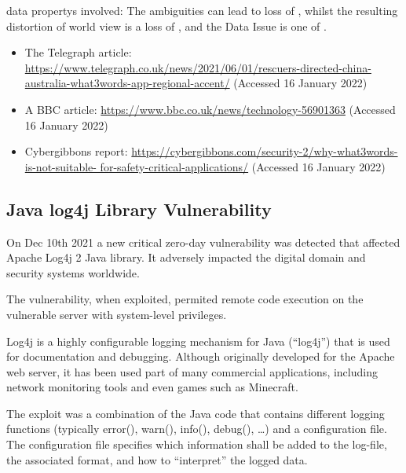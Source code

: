 \Glspl{data property} involved: The ambiguities can lead to loss of ,
whilst the resulting distortion of world view is a loss of ,
and the Data Issue is one of .

\begin{itemize}
\item The Telegraph article:
  \href{https://www.telegraph.co.uk/news/2021/06/01/rescuers-directed-china-australia-what3words-app-regional-accent/}
       {https://www.telegraph.co.uk/news/2021/06/01/rescuers-directed-china- australia-what3words-app-regional-accent/}
       (Accessed 16 January 2022)
     \item A BBC article: 
       \href{https://www.bbc.co.uk/news/technology-56901363}
            {https://www.bbc.co.uk/news/technology-56901363}
       (Accessed 16 January 2022)
          \item Cybergibbons report:
            \href{https://cybergibbons.com/security-2/why-what3words-is-not-suitable-for-safety-critical-applications/}
                 {https://cybergibbons.com/security-2/why-what3words-is-not-suitable- for-safety-critical-applications/}
       (Accessed 16 January 2022)
\end{itemize}

\cbstart\subsection{Java log4j Library Vulnerability}\cbend\label{bkm:incacc:log4j}
On Dec 10th 2021 a new critical zero-day vulnerability was detected that affected Apache Log4j 2 Java library. 
It adversely impacted the digital domain and security systems worldwide.

The vulnerability, when exploited, permited remote code execution on the vulnerable server with system-level privileges.

Log4j is a highly configurable logging mechanism for Java (“log4j”) that is used for documentation and debugging.
Although originally developed for the Apache web server, it has been used part of many commercial applications,
including network monitoring tools and even games such as Minecraft.

The exploit was a combination of the Java code that contains different logging functions
(typically error(), warn(), info(), debug(), \dots)
and a configuration file.
The configuration file specifies which \gls{information} shall be added 
to the log-file, the associated format, and how to ``interpret'' the logged data.

